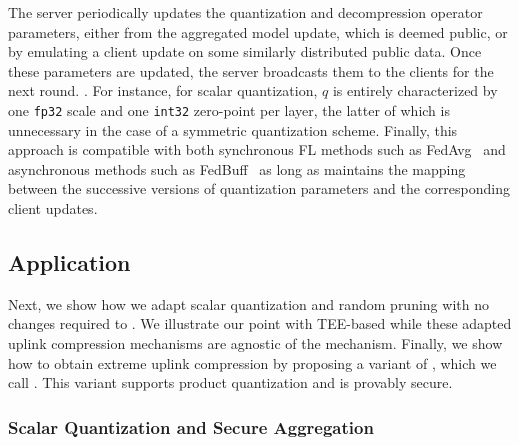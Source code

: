 The server periodically updates the quantization and decompression operator parameters, either from the aggregated model update, which is deemed public, or by emulating a client update on some similarly distributed public data. Once these parameters are updated, the server broadcasts them to the clients for the next round. . For instance, for scalar quantization, $q$ is entirely characterized by one \texttt{fp32} scale and one \texttt{int32} zero-point per layer, the latter of which is unnecessary in the case of a symmetric quantization scheme. Finally, this approach is compatible with both synchronous FL methods such as FedAvg~\cite{mcmahan2016communicationefficient} and asynchronous methods such as FedBuff~\cite{nguyen2021federated} as long as \SecAgg maintains the mapping between the successive versions of quantization parameters and the corresponding client updates.

\subsection{Application}
Next, we show how we adapt scalar quantization and random pruning with no changes required to \SecAgg. We illustrate our point with TEE-based \SecAgg while these adapted uplink compression mechanisms are agnostic of the \SecAgg mechanism. Finally, we show how to obtain extreme uplink compression by proposing a variant of \SecAgg, which we call \SecInd. This variant supports product quantization and is provably secure.

\subsubsection{Scalar Quantization and Secure Aggregation}
\label{subsubsec:sq_sa}

